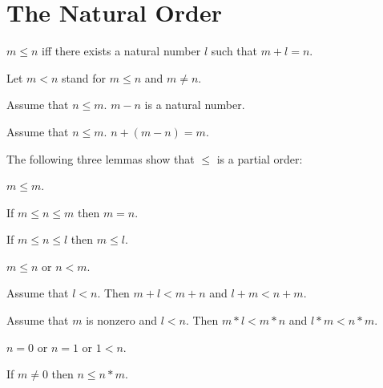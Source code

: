 \documentclass[11pt]{article}
\begin{document}
\section{The Natural Order}

\begin{forthel}

\begin{definition} $m \leq n$ iff 
there exists a natural number $l$ such that  
$m + l = n$.
\end{definition}

Let $m < n$ stand for $m \leq n$ and $m \neq n$.

\begin{signature}
  Assume that $n \leq m$.
  $m - n$ is a natural number.
\end{signature}

\begin{axiom}
  Assume that $n \leq m$.
  $n + (m - n) = m$.
\end{axiom}

\end{forthel}

The following three lemmas show that $\leq$ is a partial order:

\begin{forthel}

\begin{lemma} $m \leq m$.
\end{lemma}

\begin{lemma} If $m \leq n \leq m$ 
then $m = n$.
\end{lemma}

\begin{lemma} If $m \leq n \leq l$ 
then  $m \leq l$.
\end{lemma}

\begin{axiom} $m \leq n$ or $n < m$.
\end{axiom}

\begin{lemma} Assume that $l < n$.
  Then $m + l < m + n$ and $l + m < n + m$.
\end{lemma}

\begin{lemma} Assume that $m$ is nonzero and $l < n$.
  Then $m * l < m * n$ and $l * m < n * m$.
\end{lemma}

\begin{axiom} $n = 0$ or $n = 1$ or $1 < n$.
\end{axiom}

\begin{lemma} If $m \neq 0$ then $n \leq n * m$.
\end{lemma}
\end{forthel}
\end{document}
